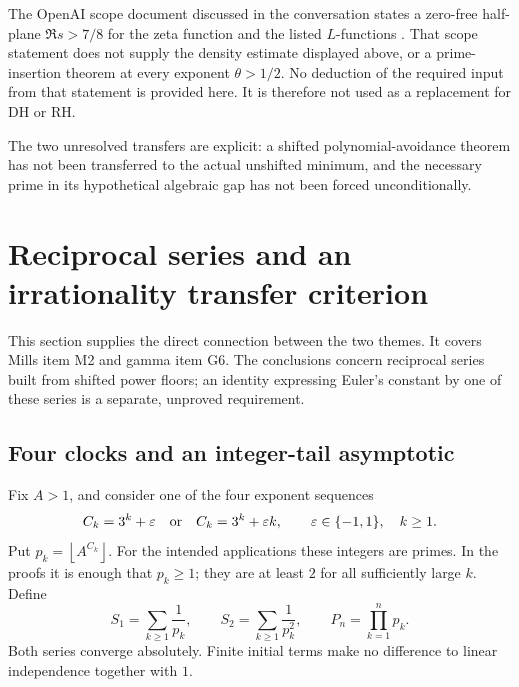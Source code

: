 \documentclass[11pt,a4paper]{article}
\numberwithin{equation}{section}
\theoremstyle{definition}
\theoremstyle{remark}
\newcommand{\floor}[1]{\left\lfloor #1\right\rfloor}
\begin{document}
The OpenAI scope document discussed in the conversation states
a zero-free half-plane \(\Re s>7/8\) for the zeta function and
the listed \(L\)-functions \cite{OpenAIQRH}.
That scope statement does not supply the density estimate
displayed above, or a prime-insertion theorem at every exponent
\(\theta>1/2\).
No deduction of the required input from that statement is
provided here. It is therefore not used as a replacement for
DH or RH.

The two unresolved transfers are explicit: a shifted
polynomial-avoidance theorem has not been transferred to the
actual unshifted minimum, and the necessary prime in its
hypothetical algebraic gap has not been forced unconditionally.

\section{Reciprocal series and an irrationality transfer criterion}
\label{rs:section}

This section supplies the direct connection between the two themes.  It
covers Mills item M2 and gamma item G6.  The conclusions concern reciprocal
series built from shifted power floors; an identity expressing Euler's
constant by one of these series is a separate, unproved requirement.

\subsection{Four clocks and an integer-tail asymptotic}

Fix $A>1$, and consider one of the four exponent sequences
\begin{equation}\label{rs:clocks}
 C_k=3^k+\varepsilon\quad\hbox{or}\quad C_k=3^k+\varepsilon k,
 \qquad \varepsilon\in\{-1,1\},\quad k\ge1.
\end{equation}
Put $p_k=\floor{A^{C_k}}$.  For the intended applications these integers
are primes.  In the proofs it is enough that $p_k\ge1$; they are at least
$2$ for all sufficiently large $k$.  Define
\[
 S_1=\sum_{k\ge1}\frac1{p_k},\qquad
 S_2=\sum_{k\ge1}\frac1{p_k^2},\qquad
 P_n=\prod_{k=1}^n p_k.
\]
Both series converge absolutely.  Finite initial terms make no difference
to linear independence together with $1$.
\end{document}
